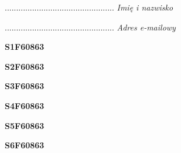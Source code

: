 \begin{turn}{90}\begin{minipage}{\linewidth} \vspace{20mm} ................................................  \textit{Imię i nazwisko}\end{minipage}\end{turn}

\begin{turn}{90}\begin{minipage}{\linewidth} \vspace{20mm} ................................................  \textit{Adres e-mailowy}\end{minipage}\end{turn}

\begin{turn}{90}\huge \begin{minipage}{\linewidth} \vspace{10mm}\textbf{S1F60863}\end{minipage}\end{turn}

\begin{turn}{90}\huge \begin{minipage}{\linewidth} \vspace{10mm}\textbf{S2F60863}\end{minipage}\end{turn}

\begin{turn}{90}\huge \begin{minipage}{\linewidth} \vspace{10mm}\textbf{S3F60863}\end{minipage}\end{turn}

\begin{turn}{90}\huge \begin{minipage}{\linewidth} \vspace{10mm}\textbf{S4F60863}\end{minipage}\end{turn}

\begin{turn}{90}\huge \begin{minipage}{\linewidth} \vspace{10mm}\textbf{S5F60863}\end{minipage}\end{turn}

\begin{turn}{90}\huge \begin{minipage}{\linewidth} \vspace{10mm}\textbf{S6F60863}\end{minipage}\end{turn}

